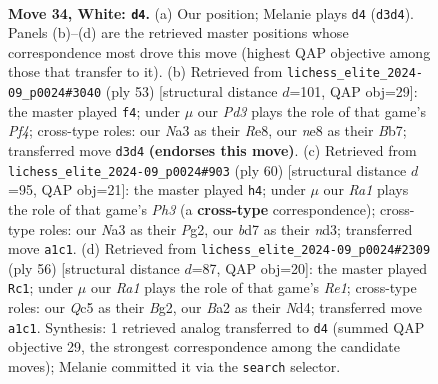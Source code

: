 \documentclass[11pt]{article}
\begin{document}
\clearpage

\begin{figure}[p]\centering
\begin{subfigure}{0.46\textwidth}\centering
\resizebox{\linewidth}{!}{%
\newchessgame
\chessboard[
  setfen={3qn2r/3b2k1/p4pp1/n1Q1p2p/P3P3/N1PP4/B4PPP/R3K1N1 w - - 2 34},
  showmover=false,
  pgfstyle=straightmove, color=movearrow, markmove={d3-d4}
]}
\caption{}
\end{subfigure}\hfill
\begin{subfigure}{0.46\textwidth}\centering
\resizebox{\linewidth}{!}{%
\newchessgame
\chessboard[
  setfen={4r1k1/1bp2q2/p6p/1p1n1ppN/1P6/P6P/1P1B1PP1/R2Q2K1 b - - 1 27},
  showmover=false,
  pgfstyle=straightmove, color=movearrow, markmove={f5-f4}
]}
\caption{}
\end{subfigure}
\\[4pt]
\begin{subfigure}{0.46\textwidth}\centering
\resizebox{\linewidth}{!}{%
\newchessgame
\chessboard[
  setfen={2q3k1/5pp1/pQ1Bn1bp/3p4/8/2PnP1NP/P4PP1/6K1 w - - 1 31},
  showmover=false,
  pgfstyle=straightmove, color=movearrow, markmove={h3-h4}
]}
\caption{}
\end{subfigure}\hfill
\begin{subfigure}{0.46\textwidth}\centering
\resizebox{\linewidth}{!}{%
\newchessgame
\chessboard[
  setfen={4r1k1/pp1q1pp1/b6p/Q2p4/3NnPP1/1P2P2P/P5B1/4R1K1 w - - 5 29},
  showmover=false,
  pgfstyle=straightmove, color=movearrow, markmove={e1-c1}
]}
\caption{}
\end{subfigure}
\caption{\textbf{Move 34, White: \texttt{d4}.} (a) Our position; Melanie plays \texttt{d4} (\texttt{d3d4}). Panels (b)--(d) are the retrieved master positions whose correspondence most drove this move (highest QAP objective among those that transfer to it). (b) Retrieved from \texttt{lichess\_elite\_2024-09\_p0024\#3040} (ply 53) [structural distance $d$=101, QAP obj=29]: the master played \texttt{f4}; under $\mu$ our \emph{Pd3} plays the role of that game's \emph{Pf4}; cross-type roles: our \emph{N}a3 as their \emph{R}e8, our \emph{n}e8 as their \emph{B}b7; transferred move \texttt{d3d4} \textbf{(endorses this move)}. (c) Retrieved from \texttt{lichess\_elite\_2024-09\_p0024\#903} (ply 60) [structural distance $d$=95, QAP obj=21]: the master played \texttt{h4}; under $\mu$ our \emph{Ra1} plays the role of that game's \emph{Ph3} (a \textbf{cross-type} correspondence); cross-type roles: our \emph{N}a3 as their \emph{P}g2, our \emph{b}d7 as their \emph{n}d3; transferred move \texttt{a1c1}. (d) Retrieved from \texttt{lichess\_elite\_2024-09\_p0024\#2309} (ply 56) [structural distance $d$=87, QAP obj=20]: the master played \texttt{Rc1}; under $\mu$ our \emph{Ra1} plays the role of that game's \emph{Re1}; cross-type roles: our \emph{Q}c5 as their \emph{B}g2, our \emph{B}a2 as their \emph{N}d4; transferred move \texttt{a1c1}. Synthesis: 1 retrieved analog transferred to \texttt{d4} (summed QAP objective 29, the strongest correspondence among the candidate moves); Melanie committed it via the \texttt{search} selector.}
\label{fig:thought-m66}
\end{figure}
\end{document}
